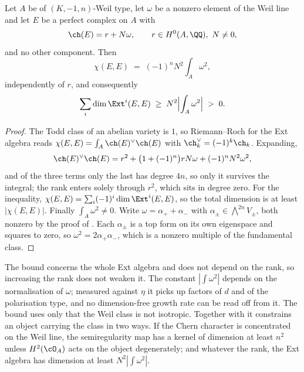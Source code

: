 \begin{proposition}%
\label{prop:objectsize}
Let $A$ be of $(K,-1,n)$-Weil type, let $\omega$ be a nonzero element of the
Weil line and let $E$ be a perfect complex on $A$ with
\[
  \ch(E)=r+N\omega,\qquad r\in H^{0}(A,\QQ),\ N\ne0,
\]
and no other component. Then
\[
  \chi(E,E)\;=\;(-1)^{n}N^{2}\!\int_{A}\omega^{2},
\]
independently of $r$, and consequently
\[
  \sum_{i}\dim\Ext^{i}(E,E)\;\ge\;N^{2}\Bigl|\int_{A}\omega^{2}\Bigr|\;>\;0 .
\]
\end{proposition}

\begin{proof}
The Todd class of an abelian variety is $1$, so Riemann--Roch for the Ext
algebra reads $\chi(E,E)=\int_{A}\ch(E)^{\vee}\ch(E)$ with
$\ch_{k}^{\vee}=(-1)^{k}\ch_{k}$. Expanding,
\[
  \ch(E)^{\vee}\ch(E)
  = r^{2}+\bigl(1+(-1)^{n}\bigr)rN\omega+(-1)^{n}N^{2}\omega^{2},
\]
and of the three terms only the last has degree $4n$, so only it survives the
integral; the rank enters solely through $r^{2}$, which sits in degree zero.
For the inequality, $\chi(E,E)=\sum_{i}(-1)^{i}\dim\Ext^{i}(E,E)$, so the
total dimension is at least $|\chi(E,E)|$. Finally $\int_{A}\omega^{2}\ne0$.
Write $\omega=\alpha_{+}+\alpha_{-}$ with $\alpha_{\pm}\in\bigwedge^{2n}V_{\pm}$,
both nonzero by the proof of . Each $\alpha_{\pm}$ is a
top form on its own eigenspace and squares to zero, so
$\omega^{2}=2\alpha_{+}\alpha_{-}$, which is a nonzero multiple of the
fundamental class.
\end{proof}

\begin{remark}\label{rem:sizeconstant}
The bound concerns the whole Ext algebra and does not depend on the rank, so
increasing the rank does not weaken it. The constant $|\int\omega^{2}|$
depends on the normalisation of $\omega$; measured against $\eta$ it picks up
factors of $d$ and of the polarisation type, and no dimension-free growth
rate can be read off from it. The bound uses only that the Weil class is not
isotropic. Together with  it constrains an object
carrying the class in two ways. If the Chern character is concentrated on the
Weil line, the semiregularity map has a kernel of dimension at least $n^{2}$
unless $H^{2}(\cO_{A})$ acts on the object degenerately; and whatever the
rank, the Ext algebra has dimension at least $N^{2}|\int\omega^{2}|$.
\end{remark}

